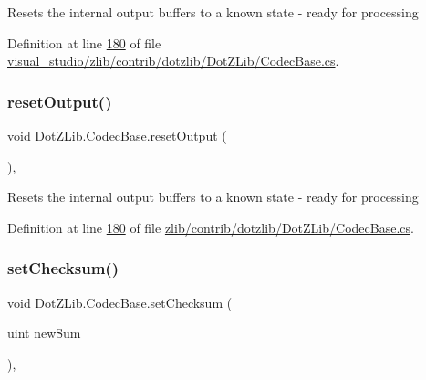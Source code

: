 Resets the internal output buffers to a known state -\/ ready for processing 



Definition at line \hyperlink{visual__studio_2zlib_2contrib_2dotzlib_2_dot_z_lib_2_codec_base_8cs_source_l00180}{180} of file \hyperlink{visual__studio_2zlib_2contrib_2dotzlib_2_dot_z_lib_2_codec_base_8cs_source}{visual\+\_\+studio/zlib/contrib/dotzlib/\+Dot\+Z\+Lib/\+Codec\+Base.\+cs}.

\mbox{\label{class_dot_z_lib_1_1_codec_base_a801b625073b21aeaab52ebf9e96dd9c9}} 
\subsubsection{\texorpdfstring{reset\+Output()}{resetOutput()}\hspace{0.1cm}{\footnotesize\ttfamily [2/2]}}
{\footnotesize\ttfamily void Dot\+Z\+Lib.\+Codec\+Base.\+reset\+Output (\begin{DoxyParamCaption}{ }\end{DoxyParamCaption})\hspace{0.3cm}{\ttfamily [inline]}, {\ttfamily [protected]}}



Resets the internal output buffers to a known state -\/ ready for processing 



Definition at line \hyperlink{zlib_2contrib_2dotzlib_2_dot_z_lib_2_codec_base_8cs_source_l00180}{180} of file \hyperlink{zlib_2contrib_2dotzlib_2_dot_z_lib_2_codec_base_8cs_source}{zlib/contrib/dotzlib/\+Dot\+Z\+Lib/\+Codec\+Base.\+cs}.

\mbox{\label{class_dot_z_lib_1_1_codec_base_a5dfa2dddf3ac857652af7fd8e3d2034d}} 
\subsubsection{\texorpdfstring{set\+Checksum()}{setChecksum()}\hspace{0.1cm}{\footnotesize\ttfamily [1/2]}}
{\footnotesize\ttfamily void Dot\+Z\+Lib.\+Codec\+Base.\+set\+Checksum (\begin{DoxyParamCaption}\item[{uint}]{new\+Sum }\end{DoxyParamCaption})\hspace{0.3cm}{\ttfamily [inline]}, {\ttfamily [protected]}}



